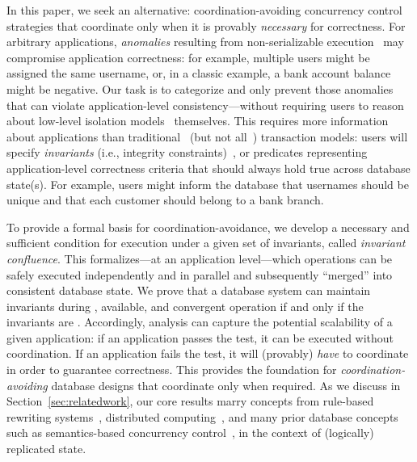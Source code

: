 In this paper, we seek an alternative: coordination-avoiding
concurrency control strategies that coordinate only when it is
provably \textit{necessary} for correctness. For arbitrary
applications, \textit{anomalies} resulting from non-serializable
execution~\cite{adya-isolation} may compromise application
correctness: for example, multiple users might be assigned the same
username, or, in a classic example, a bank account balance might be
negative. Our task is to categorize and only prevent those anomalies
that can violate application-level consistency---without requiring
users to reason about low-level isolation models~\cite{hat-vldb}
themselves. This requires more information about applications than
traditional~\cite{bernstein-book,gray-virtues} (but not
all~\cite{eswaran-consistency,korth-serializability,decomp-semantics,garciamolina-semantics,activedb-book,ic-survey,ic-survey-two})
transaction models: users will specify \textit{invariants} (i.e.,
integrity constraints)~\cite{traiger-tods}, or predicates representing
application-level correctness criteria that should always hold true
across database state(s). For example, users might inform the database
that usernames should be unique and that each customer should belong
to a bank branch.

To provide a formal basis for coordination-avoidance, we develop a
necessary and sufficient condition for \cfree execution under a given
set of invariants, called \textit{invariant confluence}. This
\iconfluence formalizes---at an application level---which operations
can be safely executed independently and in parallel and subsequently
``merged'' into consistent database state. We prove that a database
system can maintain invariants during \cfree, available, and
convergent operation if and only if the invariants are
\iconfluent. Accordingly, \iconfluence analysis can capture the
potential scalability of a given application: if an application passes
the \iconfluence test, it can be executed without coordination. If an
application fails the test, it will (provably) \textit{have} to
coordinate in order to guarantee correctness. This provides the
foundation for \textit{coordination-avoiding} database designs that
coordinate only when required. As we discuss in
Section~\ref{sec:relatedwork}, our core results marry concepts from
rule-based rewriting systems~\cite{obs-confluence,termrewriting},
distributed computing~\cite{herlihy-apologizing,gilbert-cap,hat-vldb},
and many prior database
concepts~\cite{activedb-book,ic-survey,ic-survey-two} such as
semantics-based concurrency
control~\cite{sdd1,decomp-semantics,badrinath-semantics,garciamolina-semantics,korth-serializability,atomictransactions,weihl-thesis},
in the context of (logically) replicated state.

